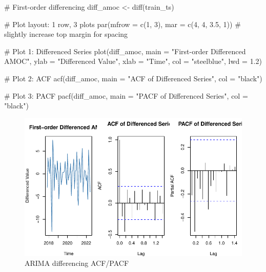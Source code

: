 \documentclass[
  11pt,
]{article}
\newenvironment{Shaded}{\begin{snugshade}}{\end{snugshade}}
\newcommand{\AttributeTok}[1]{\textcolor[rgb]{0.40,0.45,0.13}{#1}}
\newcommand{\CommentTok}[1]{\textcolor[rgb]{0.37,0.37,0.37}{#1}}
\newcommand{\DecValTok}[1]{\textcolor[rgb]{0.68,0.00,0.00}{#1}}
\newcommand{\FloatTok}[1]{\textcolor[rgb]{0.68,0.00,0.00}{#1}}
\newcommand{\FunctionTok}[1]{\textcolor[rgb]{0.28,0.35,0.67}{#1}}
\newcommand{\NormalTok}[1]{\textcolor[rgb]{0.00,0.23,0.31}{#1}}
\newcommand{\OtherTok}[1]{\textcolor[rgb]{0.00,0.23,0.31}{#1}}
\newcommand{\StringTok}[1]{\textcolor[rgb]{0.13,0.47,0.30}{#1}}
\begin{document}
\begin{Shaded}
\begin{Highlighting}[]
\CommentTok{\# First{-}order differencing}
\NormalTok{diff\_amoc }\OtherTok{\textless{}{-}} \FunctionTok{diff}\NormalTok{(train\_ts)}

\CommentTok{\# Plot layout: 1 row, 3 plots}
\FunctionTok{par}\NormalTok{(}\AttributeTok{mfrow =} \FunctionTok{c}\NormalTok{(}\DecValTok{1}\NormalTok{, }\DecValTok{3}\NormalTok{), }\AttributeTok{mar =} \FunctionTok{c}\NormalTok{(}\DecValTok{4}\NormalTok{, }\DecValTok{4}\NormalTok{, }\FloatTok{3.5}\NormalTok{, }\DecValTok{1}\NormalTok{))  }\CommentTok{\# slightly increase top margin for spacing}

\CommentTok{\# Plot 1: Differenced Series}
\FunctionTok{plot}\NormalTok{(diff\_amoc, }
     \AttributeTok{main =} \StringTok{"First{-}order Differenced AMOC"}\NormalTok{, }
     \AttributeTok{ylab =} \StringTok{"Differenced Value"}\NormalTok{, }
     \AttributeTok{xlab =} \StringTok{"Time"}\NormalTok{, }
     \AttributeTok{col =} \StringTok{"steelblue"}\NormalTok{, }
     \AttributeTok{lwd =} \FloatTok{1.2}\NormalTok{)}

\CommentTok{\# Plot 2: ACF}
\FunctionTok{acf}\NormalTok{(diff\_amoc, }
    \AttributeTok{main =} \StringTok{"ACF of Differenced Series"}\NormalTok{, }
    \AttributeTok{col =} \StringTok{"black"}\NormalTok{)}

\CommentTok{\# Plot 3: PACF}
\FunctionTok{pacf}\NormalTok{(diff\_amoc, }
     \AttributeTok{main =} \StringTok{"PACF of Differenced Series"}\NormalTok{, }
     \AttributeTok{col =} \StringTok{"black"}\NormalTok{)}
\end{Highlighting}
\end{Shaded}

\begin{figure}[H]

{\centering \includegraphics{project_files/figure-pdf/fig-diff-acf-pacf-1.pdf}

}

\caption{ARIMA differencing ACF/PACF}

\end{figure}%
\end{document}
